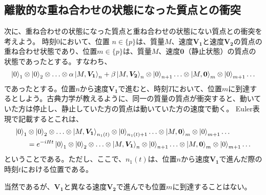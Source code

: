 \subsection{離散的な重ね合わせの状態になった質点との衝突}
次に、重ね合わせの状態になった質点と重ね合わせの状態にない質点との衝突を考えよう。
時刻$0$において、位置 $n \in \{p\}$は、質量$M$、速度$\bm{V_1}$と速度$\bm{V_2}$の質点の重ね合わせ状態であり、位置$m \in \{p\}$は、質量$M$、速度$\bm{0}$（静止状態）の質点の状態であったとする。すなわち、
\begin{equation}
    \ket{0}_1 \otimes \ket{0}_2 \otimes \ldots \otimes \alpha \ket{M,\bm{V_1}}_n + \beta \ket{M,\bm{V_2}}_n \otimes \ket{0}_{n+1} \ldots \otimes \ket{M,\bm{0}}_m \otimes \ket{0}_{m+1} \ldots
\end{equation}
であったとする。位置$n$から速度$\bm{V_1}$で進むと、時刻$T$において、位置$m$に到達するとしよう。古典力学が教えるように、同一の質量の質点が衝突すると、動いていた方は停止し、静止していた方の質点は動いていた方の速度で動く。
Euler表現で記載するとこれは、
\begin{align}
    \ket{0}_1 & \otimes \ket{0}_2 \otimes \ldots \otimes \ket{M,\bm{V_1}}_{n_1(t)} \otimes \ket{0}_{n_1(t)+1} \ldots \otimes \ket{M,\bm{0}}_m \otimes \ket{0}_{m+1} \ldots \\
    &=e^{-iHt}\ket{0}_1 \otimes \ket{0}_2 \otimes \ldots \otimes \ket{M,\bm{V_1}}_n \otimes \ket{0}_{n+1} \ldots \otimes \ket{M,\bm{0}}_m \otimes \ket{0}_{m+1} \ldots \nonumber
\end{align}
ということである。ただし、ここで、$n_1(t)$は、位置$n$から速度$\bm{V_1}$で進んだ際の時刻$t$における位置である。\par
当然であるが、$\bm{V_1}$と異なる速度$\bm{V_2}$で進んでも位置$m$に到達することはない。